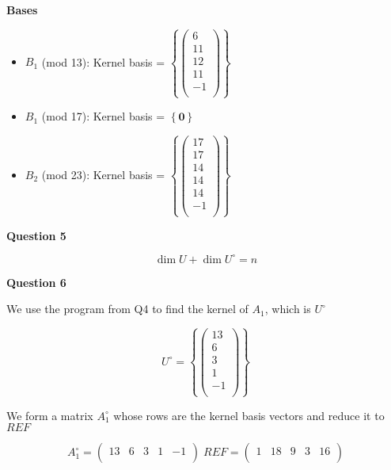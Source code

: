 \documentclass[14pt]{extarticle}
\begin{document}
\textbf{Bases}

\begin{itemize}
\item $B_1$ (mod 13):
	Kernel basis = $\left \{
					\begin{pmatrix}  6 \\ 11 \\ 12 \\ 11 \\ -1 \\\end{pmatrix} 
				\right \}$\\
\item $B_1$ (mod 17):
	Kernel basis = $\left \{ \textbf{0} \right \}$ \\
\item $B_2$ (mod 23):
	Kernel basis = $\left \{
					\begin{pmatrix} 17 \\ 17 \\ 14 \\ 14 \\ 14 \\ -1 \\\end{pmatrix}
				\right \}$	\\

\end{itemize}

\begin{center}
\textbf{Question 5}
\end{center}

\[\dim{U} + \dim{U^{\circ}} = n\]

\pagebreak

\begin{center}
\textbf{Question 6}
\end{center}

We use the program from Q4 to find the kernel of $A_1$, which is $U^{\circ}$

\[U^{\circ} = \left \{ \begin{pmatrix} 13 \\  6 \\  3 \\  1 \\ -1 \\\end{pmatrix} \right \}\]

We form a matrix $A_1^{\circ}$ whose rows are the kernel basis vectors and reduce it to $REF$

\[
A_1^{\circ} = \begin{pmatrix} 
 13 &  6 &  3 &  1 & -1 \\ 
\end{pmatrix}\;
REF  = \begin{pmatrix} 
  1 & 18 &  9 &  3 & 16 \\  
\end{pmatrix} 
\]
\end{document}
